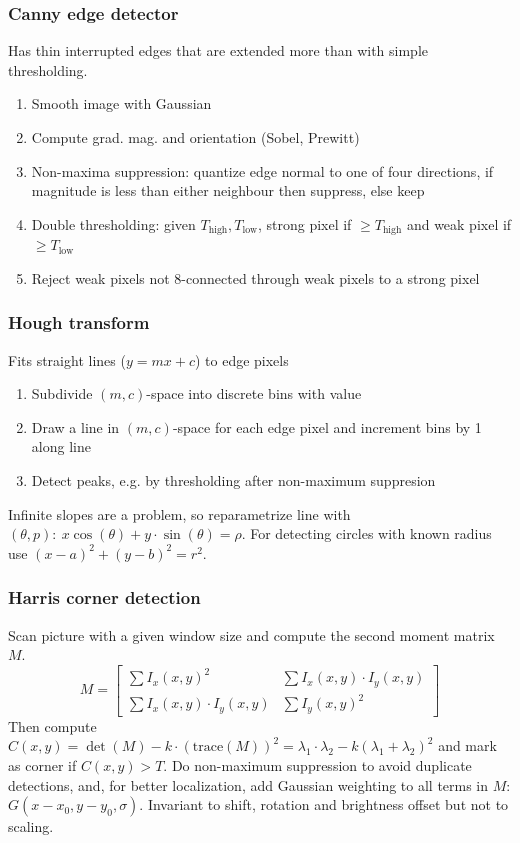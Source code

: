 \documentclass[a4paper,10pt]{article}
\begin{document}
\subsubsection{Canny edge detector}
Has thin interrupted edges that are extended more than with simple thresholding.
\begin{enumerate}
	\item Smooth image with Gaussian
	\item Compute grad. mag. and orientation (Sobel, Prewitt)
	\item Non-maxima suppression: quantize edge normal to one of four directions, if magnitude is less than either neighbour then suppress, else keep
	\item Double thresholding: given \(T_\text{high}, T_\text{low} \), strong pixel if \(\ge T_\text{high}\) and weak pixel if \(\ge T_\text{low}\) 
	\item Reject weak pixels not 8-connected through weak pixels to a strong pixel
\end{enumerate}

\subsubsection{Hough transform}
Fits straight lines (\( y = mx + c \)) to edge pixels
\begin{enumerate}
	\item Subdivide \((m, c)\)-space into discrete bins with value 
	\item Draw a line in \((m,c)\)-space for each edge pixel and increment bins by 1 along line
	\item Detect peaks, e.g. by thresholding after non-maximum suppresion
\end{enumerate}
Infinite slopes are a problem, so reparametrize line with \((\theta, p): \: x \cos (\theta) + y \cdot \sin (\theta) = \rho\). For detecting circles with known radius use \((x - a)^2 + (y - b)^2 = r^2\).

\subsubsection{Harris corner detection}
Scan picture with a given window size and compute the second moment matrix \(M\).
\[M = \begin{bmatrix}
    \sum I_x(x, y)^2 & \sum I_x(x, y) \cdot I_y(x, y) \\
    \sum I_x(x, y) \cdot I_y(x, y) & \sum I_y(x, y)^2
\end{bmatrix}\]
Then compute \(C(x, y) = \det(M) - k \cdot (\text{trace}(M))^2 = \lambda_1 \cdot \lambda_2 - k(\lambda_1 + \lambda_2)^2\) and mark as corner if \(C(x,y) > T\). Do non-maximum suppression to avoid duplicate detections, and, for better localization, add Gaussian weighting to all terms in \(M\): \(G(x - x_0, y - y_0, \sigma)\). Invariant to shift, rotation and brightness offset but not to scaling.
\end{document}

